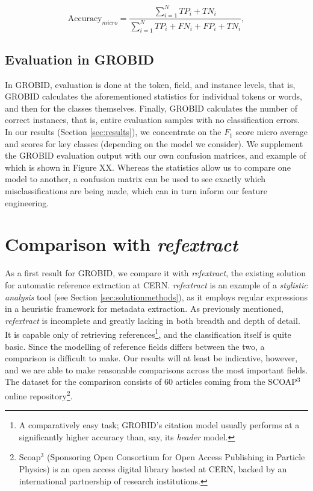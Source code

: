 \begin{equation}
\text{Accuracy}_{micro} = \frac{\sum_{i=1}^N TP_i + TN_i}{\sum_{i=1}^N TP_i + FN_i + FP_i + TN_i},
\label{eq:microaccuracy}
\end{equation}

\subsection{Evaluation in GROBID}

In GROBID, evaluation is done at the token, field, and instance levels, that is, GROBID calculates the aforementioned statistics for individual tokens or words, and then for the classes themselves. Finally, GROBID calculates the number of correct instances, that is, entire evaluation samples with no classification errors. In our results (Section \ref{sec:results}), we concentrate on the $F_1$ score micro average and scores for key classes (depending on the model we consider). We supplement the GROBID evaluation output with our own confusion matrices, and example of which is shown in Figure XX. Whereas the statistics allow us to compare one model to another, a confusion matrix can be used to see exactly which misclassifications are being made, which can in turn inform our feature engineering.

\section{Comparison with \emph{refextract}}

As a first result for GROBID, we compare it with \emph{refextract}, the existing solution for automatic reference extraction at CERN. \emph{refextract} is an example of a \emph{stylistic analysis} tool (see Section \ref{sec:solutionmethods}), as it employs regular expressions in a heuristic framework for metadata extraction. As previously mentioned, \emph{refextract} is incomplete and greatly lacking in both breadth and depth of detail. It is capable only of retrieving references\footnote{A comparatively easy task; GROBID's citation model usually performs at a significantly higher accuracy than, say, its \emph{header} model.}, and the classification itself is quite basic. Since the modelling of reference fields differs between the two, a comparison is difficult to make. Our results will at least be indicative, however, and we are able to make reasonable comparisons across the most important fields. The dataset for the comparison consists of 60 articles coming from the SCOAP$^3$ online repository\footnote{Scoap$^3$ (Sponsoring Open Consortium for Open Access Publishing in Particle Physics) is an open access digital library hosted at CERN, backed by an international partnership of research institutions.}.

